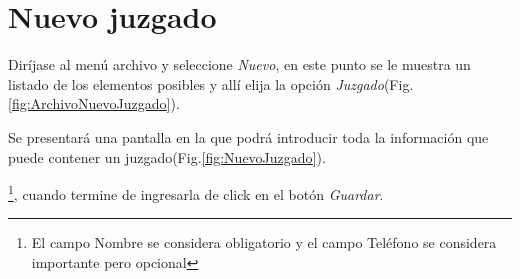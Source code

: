\section{Nuevo juzgado}
\label{sec:nuevoJuzgado}
Dir\'ijase al men\'u archivo y seleccione \emph{Nuevo}, en este punto se le muestra un listado de los elementos posibles y
all\'i elija la opci\'on \emph{Juzgado}(Fig.\ref{fig:ArchivoNuevoJuzgado}). 
  

Se presentar\'a una pantalla en la que podr\'a introducir toda la informaci\'on
que puede contener un juzgado(Fig.\ref{fig:NuevoJuzgado}). 
  
\footnote{El campo Nombre se considera obligatorio y el campo Tel\'efono se
considera importante pero opcional},
cuando termine de ingresarla de click en el bot\'on \emph{Guardar}.
